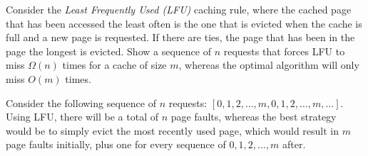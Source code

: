 \documentclass[fleqn]{homework}
\begin{document}
  \begin{problem}{6}
    \begin{question}
      Consider the \textit{Least Frequently Used (LFU)} caching rule, where the
      cached page that has been accessed the least often is the one that is
      evicted when the cache is full and a new page is requested. If there are
      ties, the page that has been in the page the longest is evicted. Show a
      sequence of $n$ requests that forces LFU to miss $\Omega(n)$ times for a
      cache of size $m$, whereas the optimal algorithm will only miss $O(m)$
      times.
    \end{question}

    Consider the following sequence of $n$ requests:
    $[0, 1, 2, \dots, m, 0, 1, 2, \dots, m, \dots]$.  Using LFU, there will be a
    total of $n$ page faults, whereas the best strategy would be to simply evict
    the most recently used page, which would result in $m$ page faults
    initially, plus one for every sequence of $0, 1, 2, \dots, m$ after.
  \end{problem}
\end{document}
